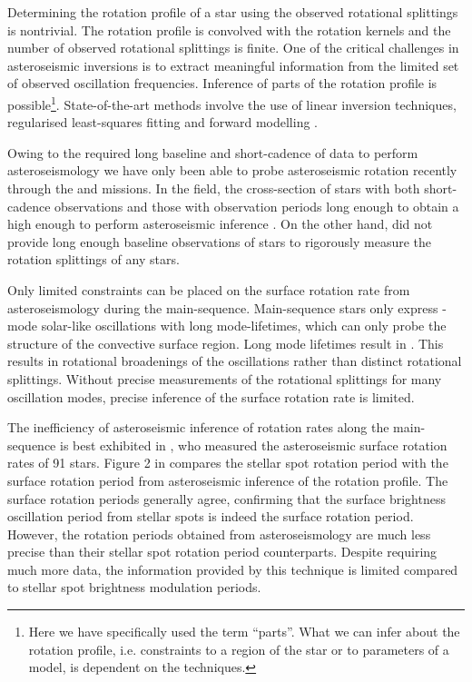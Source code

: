 Determining the rotation profile of a star using the observed rotational splittings is nontrivial. The rotation profile is convolved with the rotation kernels and the number of observed rotational splittings is finite.
One of the critical challenges in asteroseismic inversions is to extract meaningful information from the limited set of observed oscillation frequencies. Inference of parts of the rotation profile is possible\footnote{Here we have specifically used the term “parts”. What we can infer about the rotation profile, i.e. constraints to a region of the star or to parameters of a model, is dependent on the techniques.}.
State-of-the-art methods involve the use of linear inversion techniques, regularised least-squares fitting and forward modelling \citep[see, e.g.,][ for thorough discussion of these techniques]{christensen-dalsgaard_comparison_1990, christensen-dalsgaard_generalized_1993,aerts_asteroseismology_2010}.

Owing to the required long baseline and short-cadence of data to perform asteroseismology we have only been able to probe asteroseismic rotation recently through the \kepler{} and \ktoo{} missions.
In the \kepler{} field, the cross-section of stars with both short-cadence observations and those with observation periods long enough to obtain a high enough  to perform asteroseismic inference .
On the other hand, \ktoo{} did not provide long enough baseline observations of stars to rigorously measure the rotation splittings of any stars.

Only limited constraints can be placed on the surface rotation rate from asteroseismology during the main-sequence.
Main-sequence stars only express -mode solar-like oscillations with long mode-lifetimes, which can only probe the structure of the convective surface region.
Long mode lifetimes result in .
This results in rotational broadenings of the oscillations rather than distinct rotational splittings.
Without precise measurements of the rotational splittings for many oscillation modes, precise inference of the surface rotation rate is limited.

The inefficiency of asteroseismic inference of rotation rates along the main-sequence is best exhibited in \citet{hall_weakened_2021}, who measured the asteroseismic surface rotation rates of 91 stars.
Figure 2 in \citet{hall_weakened_2021} compares the stellar spot rotation period with the surface rotation period from asteroseismic inference of the rotation profile.
The surface rotation periods generally agree, confirming that the surface brightness oscillation period from stellar spots is indeed the surface rotation period.
However, the rotation periods obtained from asteroseismology are much less precise than their stellar spot rotation period counterparts.
Despite requiring much more data, the information provided by this technique is limited compared to stellar spot brightness modulation periods.

